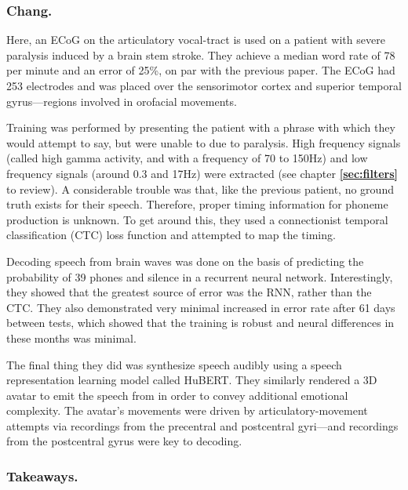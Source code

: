 \subsubsection{Chang.}

Here, an ECoG on the articulatory vocal-tract is used on a patient with severe paralysis induced by a brain stem stroke. They achieve a median word rate of 78 per minute and an error of 25\%, on par with the previous paper. The ECoG had 253 electrodes and was placed over the sensorimotor cortex and superior temporal gyrus---regions involved in orofacial movements.\newline 

Training was performed by presenting the patient with a phrase with which they would attempt to say, but were unable to due to paralysis. High frequency signals (called high gamma activity, and with a frequency of 70 to 150Hz) and low frequency signals (around 0.3 and 17Hz) were extracted (see chapter \textbf{\ref{sec:filters}} to review). A considerable trouble was that, like the previous patient, no ground truth exists for their speech. Therefore, proper timing information for phoneme production is unknown. To get around this, they used a connectionist temporal classification (CTC) loss function and attempted to map the timing.\newline

Decoding speech from brain waves was done on the basis of predicting the probability of 39 phones and silence in a recurrent neural network. Interestingly, they showed that the greatest source of error was the RNN, rather than the CTC. They also demonstrated very minimal increased in error rate after 61 days between tests, which showed that the training is robust and neural differences in these months was minimal. \newline

The final thing they did was synthesize speech audibly using a speech representation learning model called HuBERT. They similarly rendered a 3D avatar to emit the speech from in order to convey additional emotional complexity. The avatar's movements were driven by articulatory-movement attempts via recordings from the precentral and postcentral gyri---and recordings from the postcentral gyrus were key to decoding. 

\subsubsection{Takeaways.}

